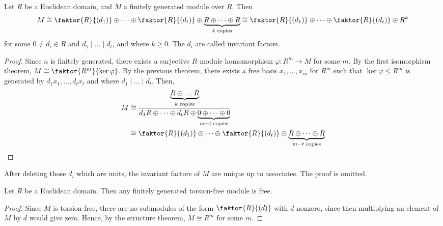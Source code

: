 \begin{theorem}
	Let $R$ be a Euclidean domain, and $M$ a finitely generated module over $R$.
	Then
	\begin{align*}
		M \cong \faktor{R}{(d_1)} \oplus \dots \oplus \faktor{R}{(d_t)} \oplus \underbrace{R \oplus \dots \oplus R}_{k \text{ copies}} \cong \faktor{R}{(d_1)} \oplus \dots \oplus \faktor{R}{(d_t)} \oplus R^k
	\end{align*}
	for some $0 \neq d_i \in R$ and $d_1 \mid \dots \mid d_t$, and where $k \geq 0$.
	The $d_i$ are called invariant factors.
\end{theorem}
\begin{proof}
	Since $n$ is finitely generated, there exists a surjective $R$-module homomorphism $\varphi : R^m \to M$ for some $m$.
	By the first isomorphism theorem, $M \cong \faktor{R^m}{\ker \varphi}$.
	By the previous theorem, there exists a free basis $x_1, \dots, x_m$ for $R^m$ such that $\ker \varphi \leq R^m$ is generated by $d_1 x_1, \dots, d_t x_t$ and where $d_1 \mid \dots \mid d_t$.
	Then,
	\begin{align*}
		M & \cong \frac{\underbrace{R \oplus \dots R}_{k \text{ copies}}}{d_1 R \oplus \dots \oplus d_t R \oplus \underbrace{0 \oplus \dots \oplus 0}_{m-t \text{ copies}}} \\
		  & \cong \faktor{R}{(d_1)} \oplus \dots \oplus \faktor{R}{(d_t)} \oplus \underbrace{R \oplus \dots \oplus R}_{m-t \text{ copies}}
	\end{align*}
\end{proof}
\begin{remark}
	After deleting those $d_i$ which are units, the invariant factors of $M$ are unique up to associates.
	The proof is omitted.
\end{remark}
\begin{corollary}
	Let $R$ be a Euclidean domain.
	Then any finitely generated torsion-free module is free.
\end{corollary}
\begin{proof}
	Since $M$ is torsion-free, there are no submodules of the form $\faktor{R}{(d)}$ with $d$ nonzero, since then multiplying an element of $M$ by $d$ would give zero.
	Hence, by the structure theorem, $M \cong R^m$ for some $m$.
\end{proof}
